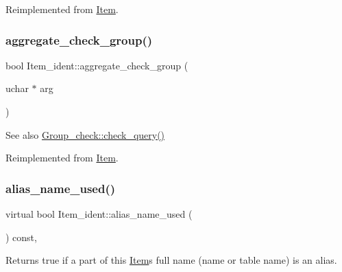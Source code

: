 Reimplemented from \mbox{\hyperlink{classItem_a7291ce9a64c0201c71463033b4346df4}{Item}}.

\mbox{\label{classItem__ident_ae79407fb0ebd076c5a45f16f36512724}} 
\subsubsection{\texorpdfstring{aggregate\+\_\+check\+\_\+group()}{aggregate\_check\_group()}}
{\footnotesize\ttfamily bool Item\+\_\+ident\+::aggregate\+\_\+check\+\_\+group (\begin{DoxyParamCaption}\item[{uchar $\ast$}]{arg }\end{DoxyParamCaption})\hspace{0.3cm}{\ttfamily [virtual]}}

\begin{DoxySeeAlso}{See also}
\mbox{\hyperlink{group__AGGREGATE__CHECKS_ga85f98a122e6f9accf528534acb5db686}{Group\+\_\+check\+::check\+\_\+query()}} 
\end{DoxySeeAlso}


Reimplemented from \mbox{\hyperlink{classItem_ab828d3602e63ad15f5cfd8ff54339189}{Item}}.

\mbox{\label{classItem__ident_a0df960611ccdb8822900a5749b61d889}} 
\subsubsection{\texorpdfstring{alias\+\_\+name\+\_\+used()}{alias\_name\_used()}}
{\footnotesize\ttfamily virtual bool Item\+\_\+ident\+::alias\+\_\+name\+\_\+used (\begin{DoxyParamCaption}{ }\end{DoxyParamCaption}) const\hspace{0.3cm}{\ttfamily [inline]}, {\ttfamily [virtual]}}

\begin{DoxyReturn}{Returns}
true if a part of this \mbox{\hyperlink{classItem}{Item}}\textquotesingle{}s full name (name or table name) is an alias. 
\end{DoxyReturn}


